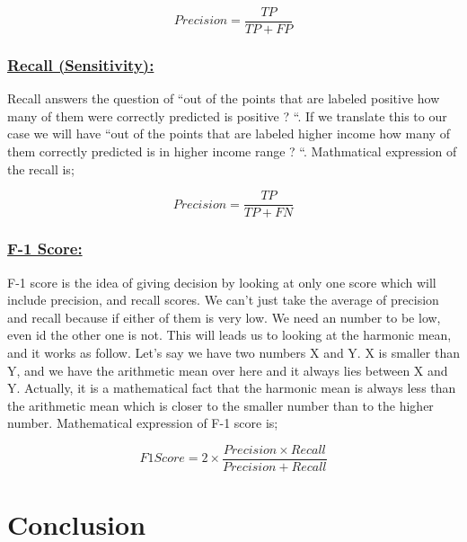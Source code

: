 \documentclass[sigconf]{acmart}
\begin{document}
\begin{equation}
Precision = \frac{TP} {TP + FP}
\end{equation}

\subsubsection{\textbf{\underline{Recall (Sensitivity):}}}

Recall answers the question of ``out of the points that are labeled positive how many of them were correctly predicted is positive ? ``. If we translate this to our case we will have ``out of the points that are labeled higher income how many of them correctly predicted is in higher income range ? ``. Mathmatical expression of the recall is; 

\begin{equation}
Precision = \frac{TP} {TP + FN}
\end{equation}

\subsubsection{\textbf{\underline{F-1 Score:}}}

F-1 score is the idea of giving decision by looking at only one score which will include  precision, and recall scores. We can't just take the average of precision and recall because if either of them is very low. We need an number to be low, even id the other one is not. This will leads us to looking at the harmonic mean, and it works as follow. Let's say we have two numbers X and Y. X is smaller than Y, and we have the arithmetic mean over here and it always lies between X and Y. Actually, it is a mathematical fact that the harmonic mean is always less than the arithmetic mean which is closer to the smaller number than to the higher number. Mathematical expression of F-1 score is; 

\begin{equation}
F1 Score = 2 \times {\frac{Precision \times Recall} {Precision + Recall}}
\end{equation}


\section{Conclusion}
\end{document}
